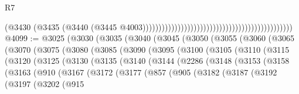 \begin{lexlean}{R7}
\begin{coremodule}
                                                                                          (@3430
                                                                                            (@3435
                                                                                              (@3440
                                                                                                (@3445
                                                                                                  @4003)))))))))))))))))))))))))))))))))))))))))))))))
@4099 := @3025
    (@3030
      (@3035
        (@3040
          (@3045
            (@3050
              (@3055
                (@3060
                  (@3065
                    (@3070
                      (@3075
                        (@3080
                          (@3085
                            (@3090
                              (@3095
                                (@3100
                                  (@3105
                                    (@3110
                                      (@3115
                                        (@3120
                                          (@3125
                                            (@3130
                                              (@3135
                                                (@3140
                                                  (@3144
                                                    (@2286
                                                      (@3148
                                                        (@3153
                                                          (@3158
                                                            (@3163
                                                              (@910
                                                                (@3167
                                                                  (@3172
                                                                    (@3177
                                                                      (@857
                                                                        (@905
                                                                          (@3182
                                                                            (@3187
                                                                              (@3192
                                                                                (@3197
                                                                                  (@3202
                                                                                    (@915

\end{coremodule}
\end{lexlean}

